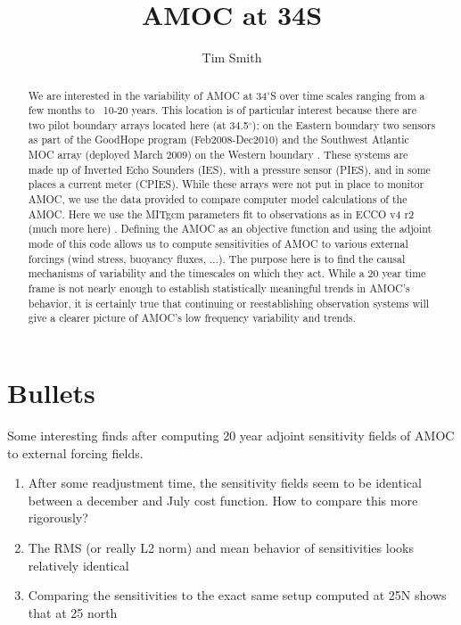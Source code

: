 \documentclass[a4paper,11pt]{article}
\title{\vspace{-10ex}AMOC at 34S}
\author{Tim Smith}
\date{\vspace{-3ex}}
\begin{document}
\maketitle

\begin{abstract}
  We are interested in the variability of AMOC at 34$^{\circ}$S over time scales ranging from a few months to ~10-20 years. This location is of particular interest because there are two pilot boundary arrays located here (at 34.5$^{\circ}$): on the Eastern boundary two sensors as part of the GoodHope program (Feb2008-Dec2010) and the Southwest Atlantic MOC array (deployed March 2009) on the Western boundary \cite{meinenSamoc}. These systems are made up of Inverted Echo Sounders (IES), with a pressure sensor (PIES), and in some places a current meter (CPIES). While these arrays were not put in place to monitor AMOC, we use the data provided to compare computer model calculations of the AMOC. Here we use the MITgcm parameters fit to observations as in ECCO v4 r2 (much more here) \cite{forgetEccov4}. Defining the AMOC as an objective function and using the adjoint mode of this code allows us to compute sensitivities of AMOC to various external forcings (wind stress, buoyancy fluxes, ...). The purpose here is to find the causal mechanisms of variability and the timescales on which they act. While a 20 year time frame is not nearly enough to establish statistically meaningful trends in AMOC's behavior, it is certainly true that continuing or reestablishing observation systems will give a clearer picture of AMOC's low frequency variability and trends. 
\end{abstract}

\section{Bullets}
Some interesting finds after computing 20 year adjoint sensitivity fields of AMOC to external forcing fields. 
\begin{enumerate}
	\item After some readjustment time, the sensitivity fields seem to be identical between a december and July cost function. How to compare this more rigorously? 
	\item The RMS (or really L2 norm) and mean behavior of sensitivities looks relatively identical 
	\item Comparing the sensitivities to the exact same setup computed at 25N shows that at 25 north 
\end{enumerate}
\end{document}

